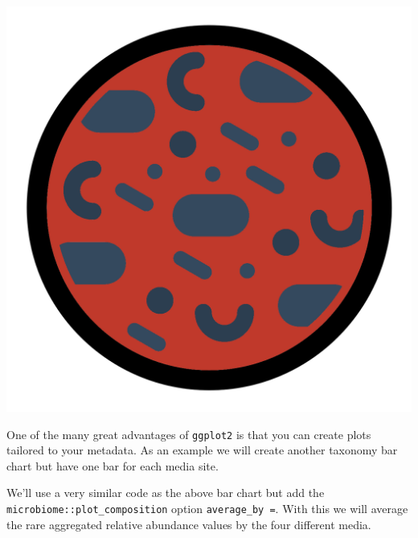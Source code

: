 \documentclass[
]{book}
\begin{document}
\includegraphics{figures/petri.png}

One of the many great advantages of \texttt{ggplot2} is that you can create plots tailored to your metadata.
As an example we will create another taxonomy bar chart but have one bar for each media site.

We'll use a very similar code as the above bar chart but add the \texttt{microbiome::plot\_composition} option \texttt{average\_by\ =}.
With this we will average the rare aggregated relative abundance values by the four different media.
\end{document}
